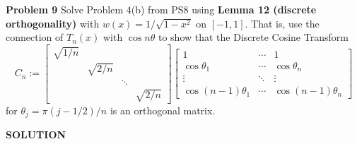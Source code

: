 \documentclass[12pt,a4paper]{article}
\begin{document}
\textbf{Problem 9} Solve Problem 4(b) from PS8 using \textbf{Lemma 12 (discrete orthogonality)} with $w(x) = 1/\sqrt{1-x^2}$ on $[-1,1]$. That is, use the connection of $T_n(x)$ with $\cos n \ensuremath{\theta}$ to show that the Discrete Cosine Transform
\[
C_n := \begin{bmatrix}
\sqrt{1/n} \\
 & \sqrt{2/n} \\
 && \ensuremath{\ddots} \\
 &&& \sqrt{2/n}
 \end{bmatrix}
\begin{bmatrix}
    1 & \ensuremath{\cdots} & 1\\
    \cos \ensuremath{\theta}_1 & \ensuremath{\cdots} & \cos \ensuremath{\theta}_n \\
    \ensuremath{\vdots} & \ensuremath{\ddots} & \ensuremath{\vdots} \\
    \cos (n-1)\ensuremath{\theta}_1 & \ensuremath{\cdots} & \cos (n-1)\ensuremath{\theta}_n
\end{bmatrix}
\]
for $\ensuremath{\theta}_j = \ensuremath{\pi}(j-1/2)/n$ is an orthogonal matrix.

\textbf{SOLUTION}
\end{document}
